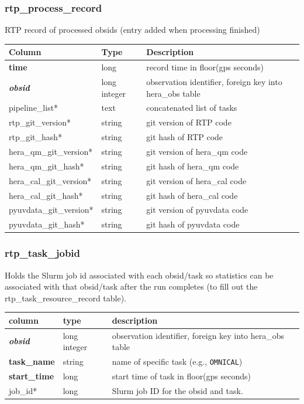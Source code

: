 \documentclass{article}
\begin{document}
{\subsubsection{rtp\_process\_record}
RTP record of processed obsids (entry added when processing finished)
\begin{center}
 \begin{tabular}{| p{4cm} | p{2cm} | p{10cm} |}
\hline
 {\bf Column} & {\bf Type}  & {\bf Description} \\ [0.5ex]  \hline\hline
\textbf{time} & long & record time in floor(gps seconds)\\ \hline
\textit{\textbf{obsid}} & long integer & observation identifier, foreign key into hera\_obs table \\ \hline
pipeline\_list* & text & concatenated list of tasks  \\\hline
rtp\_git\_version* & string & git version of RTP code  \\\hline
rtp\_git\_hash* & string & git hash of RTP code  \\\hline
hera\_qm\_git\_version* & string & git version of hera\_qm code  \\\hline
hera\_qm\_git\_hash* & string & git hash of hera\_qm code  \\\hline
hera\_cal\_git\_version* & string & git version of hera\_cal code  \\\hline
hera\_cal\_git\_hash* & string & git hash of hera\_cal code  \\\hline
pyuvdata\_git\_version* & string & git version of pyuvdata code  \\\hline
pyuvdata\_git\_hash* & string & git hash of pyuvdata code  \\\hline
\end{tabular}
\end{center}

\subsubsection{rtp\_task\_jobid}
Holds the Slurm job id associated with each obsid/task so statistics can be associated with
that obsid/task after the run completes (to fill out the rtp\_task\_resource\_record table).
\begin{center}
  \begin{tabular}{| p{4cm} | p{2cm} | p{10cm} |}
\hline
 column & type & description \\ [0.5ex] \hline\hline
\textit{\textbf{obsid}} & long integer & observation identifier, foreign key into hera\_obs table \\ \hline
\textbf{task\_name} & string & name of specific task (e.g., \verb+OMNICAL+) \\ \hline
\textbf{start\_time} & long & start time of task in floor(gps seconds) \\ \hline
job\_id* & long &  Slurm job ID for the obsid and task. \\ \hline
\end{tabular}
\end{center}

}
\end{document}
